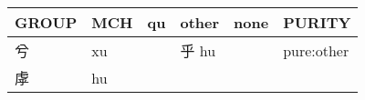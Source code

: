 \documentclass[14pt,a4paper]{scrartcl}
\begin{document}
\begin{longtable}[c]{@{}llllll@{}}
\toprule
\begin{minipage}[b]{0.14\columnwidth}\raggedright\strut
GROUP
\strut\end{minipage} &
\begin{minipage}[b]{0.14\columnwidth}\raggedright\strut
MCH
\strut\end{minipage} &
\begin{minipage}[b]{0.14\columnwidth}\raggedright\strut
qu
\strut\end{minipage} &
\begin{minipage}[b]{0.14\columnwidth}\raggedright\strut
other
\strut\end{minipage} &
\begin{minipage}[b]{0.14\columnwidth}\raggedright\strut
none
\strut\end{minipage} &
\begin{minipage}[b]{0.14\columnwidth}\raggedright\strut
PURITY
\strut\end{minipage}\tabularnewline
\midrule
\endhead
\begin{minipage}[t]{0.14\columnwidth}\raggedright\strut
兮
\strut\end{minipage} &
\begin{minipage}[t]{0.14\columnwidth}\raggedright\strut
xu
\strut\end{minipage} &
\begin{minipage}[t]{0.14\columnwidth}\raggedright\strut
\strut\end{minipage} &
\begin{minipage}[t]{0.14\columnwidth}\raggedright\strut
乎 hu
\strut\end{minipage} &
\begin{minipage}[t]{0.14\columnwidth}\raggedright\strut
\strut\end{minipage} &
\begin{minipage}[t]{0.14\columnwidth}\raggedright\strut
pure:other
\strut\end{minipage}\tabularnewline
\begin{minipage}[t]{0.14\columnwidth}\raggedright\strut
虖
\strut\end{minipage} &
\begin{minipage}[t]{0.14\columnwidth}\raggedright\strut
hu
\strut\end{minipage} &
\begin{minipage}[t]{0.14\columnwidth}\raggedright\strut
\strut\end{minipage} &
\begin{minipage}[t]{0.14\columnwidth}\raggedright\strut

\end{minipage}
\end{longtable}
\end{document}
